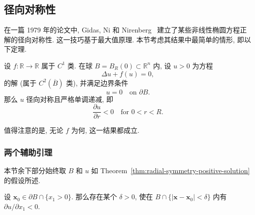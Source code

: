 \subsection{径向对称性}\label{sec:radial-symmetry}

在一篇 1979 年的论文中, Gidas, Ni 和 Nirenberg~\cite{GNN} 建立了某些非线性椭圆方程正解的径向对称性. 这一技巧基于最大值原理. 本节考虑其结果中最简单的情形, 即以下定理.

\begin{Theorem}
\label{thm:radial-symmetry-positive-solution}
设 $f:\mathbb{R}\to\mathbb{R}$ 属于 $C^1$ 类. 在球 $B=B_R(0)\subset\mathbb{R}^n$ 内, 设 $u>0$ 为方程
\begin{equation}\label{eq:radial-symmetry-semilinear-equation}
\Delta u+f(u)=0,
\end{equation}
的解 (属于 $C^2(\overline B)$ 类), 并满足边界条件
\begin{equation}\label{eq:radial-symmetry-zero-boundary}
u=0\quad\text{on }\partial B.
\end{equation}
那么 $u$ 径向对称且严格单调递减, 即
\begin{equation}\label{eq:radial-symmetry-strict-decrease}
\dfrac{\partial u}{\partial r}<0\quad\text{for }0<r<R.
\end{equation}

\end{Theorem}

值得注意的是, 无论 $f$ 为何, 这一结果都成立.

\subsubsection{两个辅助引理}\label{subsec:radial-auxiliary-lemmas}

本节余下部分始终取 $B$ 和 $u$ 如 Theorem~\ref{thm:radial-symmetry-positive-solution} 的假设所述.

\begin{Lemma}
\label{lem:radial-boundary-directional-derivative}
设 $\bm{x}_0\in\partial B\cap\{x_1>0\}$. 那么存在某个 $\delta>0$, 使在 $B\cap\{|\bm{x}-\bm{x}_0|<\delta\}$ 内有 $\partial u/\partial x_1<0$.
\end{Lemma}


